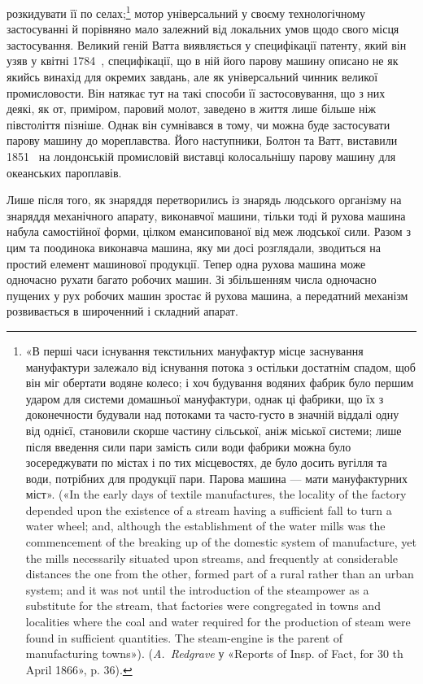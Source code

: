 розкидувати її по селах;\footnote{
«В перші часи існування текстильних мануфактур місце заснування
мануфактури залежало від існування потока з остільки достатнім
спадом, щоб він міг обертати водяне колесо; і хоч будування водяних
фабрик було першим ударом для системи домашньої мануфактури, однак
ці фабрики, що їх з доконечности будували над потоками та часто-густо
в значній віддалі одну від однієї, становили скорше частину сільської, аніж
міської системи; лише після введення сили пари замість сили води фабрики
можна було зосереджувати по містах і по тих місцевостях, де було досить
вугілля та води, потрібних для продукції пари. Парова машина — мати
мануфактурних міст». («In the early days of textile manufactures, the locality
of the factory depended upon the existence of a stream having a sufficient
fall to turn a water wheel; and, although the establishment of the water
mills was the commencement of the breaking up of the domestic system of
manufacture, yet the mills necessarily situated upon streams, and frequently
at considerable distances the one from the other, formed part of a rural rather
than an urban system; and it was not until the introduction of the steampower
as a substitute for the stream, that factories were congregated in towns and
localities where the coal and water required for the production of steam were
found in sufficient quantities. The steam-engine is the parent of manufacturing
towns»). (\emph{A.~Redgrave} у «Reports of Insp. of Fact, for 30 th
April 1866», p. 36).
} мотор універсальний у своєму технологічному
застосуванні й порівняно мало залежний від локальних
умов щодо свого місця застосування. Великий геній Ватта
виявляється у специфікації патенту, який він узяв у квітні 1784~,
специфікації, що в ній його парову машину описано не як якийсь
винахід для окремих завдань, але як універсальний чинник
великої промисловости. Він натякає тут на такі способи її застосовування,
що з них деякі, як от, приміром, паровий молот,
заведено в життя лише більше ніж півстоліття пізніше. Однак
він сумнівався в тому, чи можна буде застосувати парову машину
до мореплавства. Його наступники, Болтон та Ватт, виставили
1851~ на лондонській промисловій виставці колосальнішу парову
машину для океанських пароплавів.

Лише після того, як знаряддя перетворились із знарядь людського
організму на знаряддя механічного апарату, виконавчої
машини, тільки тоді й рухова машина набула самостійної форми,
цілком емансипованої від меж людської сили. Разом з цим та
поодинока виконавча машина, яку ми досі розглядали, зводиться
на простий елемент машинової продукції. Тепер одна рухова
машина може одночасно рухати багато робочих машин. Зі збільшенням
числа одночасно пущених у рух робочих машин зростає
й рухова машина, а передатний механізм розвивається в широченний
і складний апарат.

